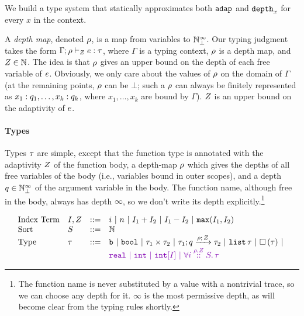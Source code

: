We build a type system that statically approximates both $\mathtt{adap}$ and
$\mathtt{depth}_{x}$ for every $x$ in the context.

A \emph{depth map}, denoted $\rho$, is a map from variables to
$\mathbb{N}_{\bot}^\infty$.
%
%
Our typing judgment takes the form $\Gamma; \rho \vdash_{Z}
e: \tau$, where $\Gamma$ is a typing context, $\rho$ is a depth
map, and $Z \in \mathbb{N}$. The idea is that $\rho$ gives an upper
bound on the depth of each free variable of $e$. Obviously, we
only care about the values of $\rho$ on the domain of $\Gamma$ (at
the remaining points, $\rho$ can be $\bot$; such a $\rho$ can always
be finitely represented as $x_1: q_1, \ldots, x_k: q_k$,
where $x_1,\ldots,x_k$ are bound by $\Gamma$). $Z$ is an upper
bound on the adaptivity of $e$.

\paragraph{Types}
Types $\tau$ are simple, except that the function type is annotated
with the adaptivity $Z$ of the function body, a depth-map $\rho$
which gives the depths of all free variables of the body (i.e.,
variables bound in outer scopes), and a depth $q \in \mathbb{N}_{\bot}^\infty$ of
the argument variable in the body. The function name, although free in
the body, always has depth $\infty$, so we don't write its depth
explicitly.\footnote{The function name is never substituted by a value
  with a nontrivial trace, so we can choose any depth for it. $\infty$
  is the most permissive depth, as will become clear from the typing
  rules shortly.}

\[
\begin{array}{llll}
\mbox{Index Term} & \idx, \nnatA & ::= &     i ~|~ n ~|~ \idx_1 + \idx_2 ~|~  \idx_1
                                 - \idx_2 ~|~ \smax{\idx_1}{\idx_2}\\
  \mbox{Sort} & S & ::= & \nat \\
  \mbox{Type} & \type & ::= & \tbase ~|~ \tbool ~|~ \type_1 \times
  \type_2 ~|~ \tarr{\type_1}{\type_2}{\nnatbiA}{\dmap}{\nnatA} ~|~
                              \tlist{\type} ~|~ \tbox{\type} ~|~ \\
    & & & \wq{   \treal ~|~ \tint ~|~   \tint[I]  ~|~      \tforall{\dmap}{\nnatA}{i} \type  }
\end{array}
\]

